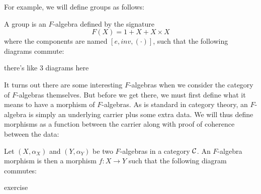 For example, we will define groups as follows:

\begin{definition}[Group]
  A group is an $F$-algebra defined by the signature $$ F(X) = 1 + X + X \times X $$ where the components are named $[e, inv, (\cdot)]$, such that the following diagrams commute:

  \todo there's like 3 diagrams here
    



\end{definition}

It turns out there are some interesting $F$-algebras when we consider the category of $F$-algebras themselves.
But before we get there, we must first define what it means to have a morphism of $F$-algebras.
As is standard in category theory, an $F$-algebra is simply an underlying carrier plus some extra data.
We will thus define morphisms as a function between the carrier along with proof of coherence between the data:

\begin{definition}
  Let $(X, \alpha_X)$ and $(Y, \alpha_Y)$ be two $F$-algebras in a category $\mathcal C$.
  An $F$-algebra morphism is then a morphism $f : X \rightarrow Y$ such that the following diagram commutes:

\end{definition}

\todo exercise

